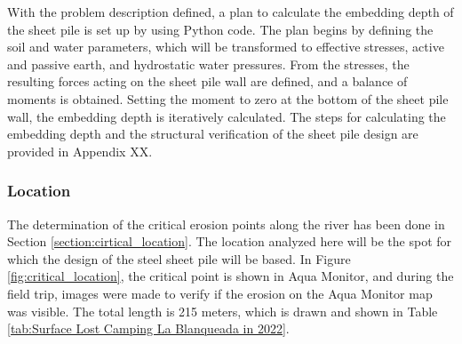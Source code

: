With the problem description defined, a plan to calculate the embedding depth of the sheet pile is set up by using Python code. The plan begins by defining the soil and water parameters, which will be transformed to effective stresses, active and passive earth, and hydrostatic water pressures. From the stresses, the resulting forces acting on the sheet pile wall are defined, and a balance of moments is obtained. Setting the moment to zero at the bottom of the sheet pile wall, the embedding depth is iteratively calculated. The steps for calculating the embedding depth and the structural verification of the sheet pile design are provided in Appendix XX.



\subsubsection{Location}

The determination of the critical erosion points along the river has been done in Section \ref{section:cirtical_location}. The location analyzed here will be the spot for which the design of the steel sheet pile will be based. In Figure \ref{fig:critical_location}, the critical point is shown in Aqua Monitor, and during the field trip, images were made to verify if the erosion on the Aqua Monitor map was visible. The total length is 215 meters, which is drawn and shown in Table \ref{tab:Surface Lost Camping La Blanqueada in 2022}.



